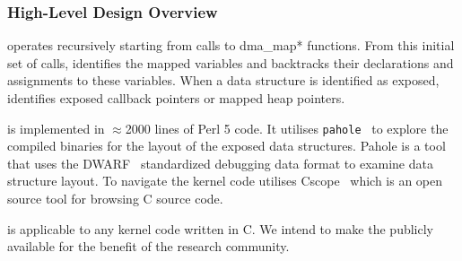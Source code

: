 

\subsubsection{High-Level Design Overview}

\tool operates recursively starting from calls to dma\_map* functions. From this initial set of calls, \tool identifies the mapped variables and backtracks their declarations and assignments to these variables. When a data structure is identified as exposed, \tool identifies exposed callback pointers or mapped heap pointers. 



\tool is implemented in $\approx$2000 lines of Perl 5 code. It utilises \texttt{pahole}~\cite{dwarves} to explore the compiled binaries for the layout of the exposed data structures. Pahole is a tool that uses the DWARF~\cite{dwarf} standardized debugging data format to examine data structure layout. To navigate the kernel code \tool utilises Cscope~\cite{cscope,cscope_92} which is an open source tool for browsing C source code.

\tool is applicable to any kernel code written in C. We intend to make the \tool publicly available for the benefit of the research community.


